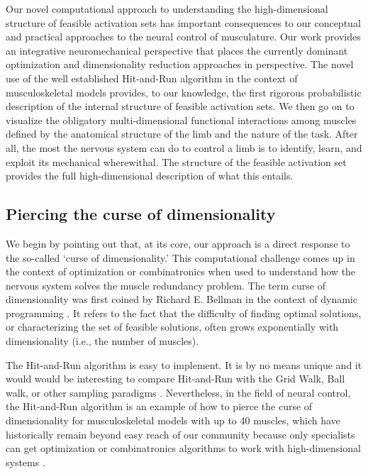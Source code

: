 Our novel computational approach to understanding the high-dimensional structure of feasible activation sets has important consequences to our conceptual and practical approaches to the neural control of musculature.  Our work provides an integrative neuromechanical perspective that places the currently dominant optimization and dimensionality reduction approaches in perspective. The novel use of the well established Hit-and-Run algorithm in the context of musculoskeletal models provides, to our knowledge, the first  rigorous probabilistic description of the internal structure of feasible activation sets. We then go on to visualize the obligatory multi-dimensional functional interactions among muscles defined by the anatomical structure of the limb and the nature of the task. After all, the most the nervous system can do to control a limb is  to identify, learn, and exploit its mechanical wherewithal. The structure of the feasible activation set provides the full high-dimensional description of what this entails.


\subsection*{Piercing the curse of dimensionality}
We begin by pointing out that, at its core, our approach is a direct response to the so-called `curse of dimensionality.'  This computational challenge comes up in the context of optimization \cite{todorov2002optimal} or combinatronics \cite{valero-cuevas2015fundamentals} when used to understand how the nervous system solves the muscle redundancy problem. The term curse of dimensionality was first coined by Richard E. Bellman  in the context of dynamic programming \cite{bellman1957dynamic}. It refers to the fact that the difficulty of finding optimal  solutions,  or characterizing the set of feasible solutions, often grows exponentially with  dimensionality (i.e., the number of muscles).

The Hit-and-Run algorithm is easy to implement. It is by no means unique and it would would be interesting to compare Hit-and-Run with the Grid Walk, Ball walk, or other sampling paradigms \cite{Vempala}. Nevertheless, in the field of neural control, the Hit-and-Run algorithm is an example of how to pierce the curse of dimensionality for musculoskeletal models with up to 40 muscles, which have historically remain beyond easy reach of our community because only specialists  can get optimization  or combinatronics algorithms to work with high-dimensional systems  \cite{valero-cuevas2009computational,sohn2013cat_bounding_box,Valero-Cuevas2015high-dimensional,todorov2002optimal}.

